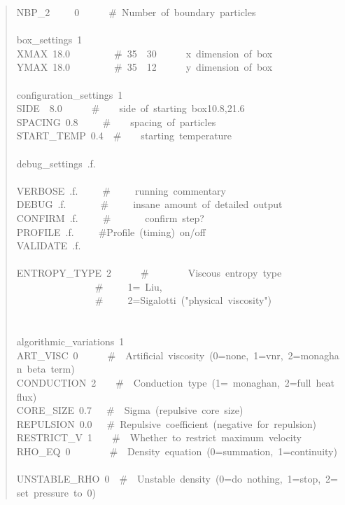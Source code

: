 \begin{quote}
{NBP{\_}2~~~~~0~~~~~~{\#}~Number~of~boundary~particles~\\
~\\
box{\_}settings~1~\\
XMAX~18.0~~~~~~~~~{\#}~35~~30~~~~~~x~dimension~of~box~\\
YMAX~18.0~~~~~~~~~{\#}~35~~12~~~~~~y~dimension~of~box~\\
~\\
configuration{\_}settings~1~\\
SIDE~~8.0~~~~~~{\#}~~~~side~of~starting~box10.8,21.6~\\
SPACING~0.8~~~~~{\#}~~~~spacing~of~particles~\\
START{\_}TEMP~0.4~~{\#}~~~~starting~temperature~\\
~\\
debug{\_}settings~.f.~\\
~\\
VERBOSE~.f.~~~~~{\#}~~~~~running~commentary~\\
DEBUG~.f.~~~~~~~{\#}~~~~~insane~amount~of~detailed~output~\\
CONFIRM~.f.~~~~~{\#}~~~~~~~confirm~step?~\\
PROFILE~.f.~~~~~{\#}Profile~(timing)~on/off~\\
VALIDATE~.f.~\\
~\\
ENTROPY{\_}TYPE~2~~~~~~{\#}~~~~~~~~Viscous~entropy~type~\\
~~~~~~~~~~~~~~~~{\#}~~~~~1=~Liu,~\\
~~~~~~~~~~~~~~~~{\#}~~~~~2=Sigalotti~("physical~viscosity")~\\
~\\
~\\
algorithmic{\_}variations~1~\\
ART{\_}VISC~0~~~~~~{\#}~~Artificial~viscosity~(0=none,~1=vnr,~2=monaghan~beta~term)~\\
CONDUCTION~2~~~~{\#}~~Conduction~type~(1=~monaghan,~2=full~heat~flux)~\\
CORE{\_}SIZE~0.7~~~{\#}~~Sigma~(repulsive~core~size)~\\
REPULSION~0.0~~~{\#}~Repulsive~coefficient~(negative~for~repulsion)~\\
RESTRICT{\_}V~1~~~~{\#}~~Whether~to~restrict~maximum~velocity~\\
RHO{\_}EQ~0~~~~~~~~{\#}~~Density~equation~(0=summation,~1=continuity)~\\
UNSTABLE{\_}RHO~0~~{\#}~~Unstable~density~(0=do~nothing,~1=stop,~2=set~pressure~to~0)~\\
}
\end{quote}
